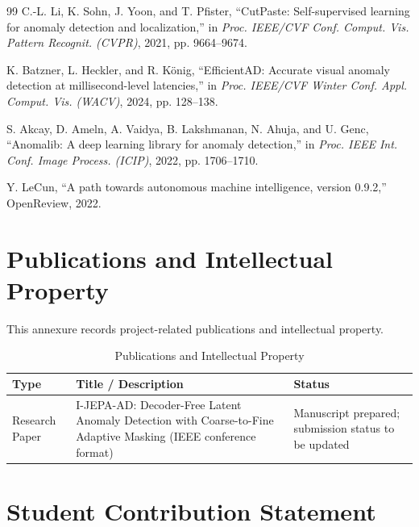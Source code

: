 \documentclass[12pt,a4paper,oneside]{report}
\begin{document}
\begin{thebibliography}{99}
 C.-L. Li, K. Sohn, J. Yoon, and T. Pfister, ``CutPaste: Self-supervised learning for anomaly detection and localization,'' in \textit{Proc. IEEE/CVF Conf. Comput. Vis. Pattern Recognit. (CVPR)}, 2021, pp. 9664--9674.

 K. Batzner, L. Heckler, and R. K\"onig, ``EfficientAD: Accurate visual anomaly detection at millisecond-level latencies,'' in \textit{Proc. IEEE/CVF Winter Conf. Appl. Comput. Vis. (WACV)}, 2024, pp. 128--138.

 S. Akcay, D. Ameln, A. Vaidya, B. Lakshmanan, N. Ahuja, and U. Genc, ``Anomalib: A deep learning library for anomaly detection,'' in \textit{Proc. IEEE Int. Conf. Image Process. (ICIP)}, 2022, pp. 1706--1710.

 Y. LeCun, ``A path towards autonomous machine intelligence, version 0.9.2,'' OpenReview, 2022.

\end{thebibliography}

\appendix

\chapter{Publications and Intellectual Property}

This annexure records project-related publications and intellectual
property.

\begin{table}[H]
\centering
\caption{Publications and Intellectual Property}
\begin{tabular}{p{}p{}p{}}
\toprule
Type & Title / Description & Status\\
\midrule
Research Paper & I-JEPA-AD: Decoder-Free Latent Anomaly Detection with Coarse-to-Fine Adaptive Masking (IEEE conference format) & Manuscript prepared; submission status to be updated\\
\bottomrule
\end{tabular}
\end{table}

\chapter{Student Contribution Statement}
\end{document}
